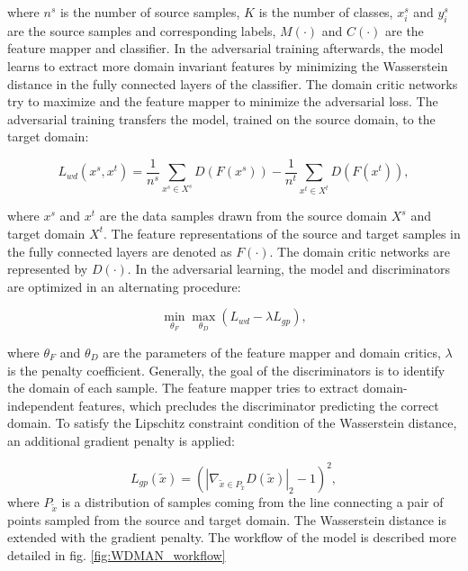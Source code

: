 where $n^{s}$ is the number of source samples, $K$ is the number of classes, $x_{i}^{s}$ and $y_{i}^{s}$ are the source samples and corresponding labels, $M(\cdot)$ and $C(\cdot)$ are the feature mapper and classifier. In the adversarial training afterwards, the model learns to extract more domain invariant features by minimizing the Wasserstein distance in the fully connected layers of the classifier. The domain critic networks try to maximize and the feature mapper to minimize the adversarial loss. The adversarial training transfers the model, trained on the source domain, to the target domain:
 
\begin{equation}
     L_{wd}(x^{s}, x^{t}) = \frac{1}{n^{s}} \sum_{x^{s} \in X^{s}} D(F(x^{s})) - \frac{1}{n^{t}} \sum_{x^{t} \in X^{t}} D(F(x^{t})),
\end{equation}

where $x^{s}$ and $x^{t}$ are the data samples drawn from the source domain $X^{s}$ and target domain $X^{t}$. The feature representations of the source and target samples in the fully connected layers are denoted as $F(\cdot)$. The domain critic networks are represented by $D(\cdot)$. In the adversarial learning, the model and discriminators are optimized in an alternating procedure:

\begin{equation}
    \min_{\theta_{F}} \max_{\theta_{D}} (L_{wd} - \lambda L_{gp}), 
\end{equation}

where $\theta_{F}$ and $\theta_{D}$ are the parameters of the feature mapper and domain critics, $\lambda$ is the penalty coefficient. Generally, the goal of the discriminators is to identify the domain of each sample. The feature mapper tries to extract domain-independent features, which precludes the discriminator predicting the correct domain. To satisfy the Lipschitz constraint condition of the Wasserstein distance, an additional gradient penalty is applied: 

\begin{equation}
     L_{gp}(\tilde{x}) = (|\nabla_{\tilde{x} \in P_{\tilde{x}}} D(\tilde{x})|_{2}-1)^{2}, 
\end{equation}
where $P_{\tilde{x}}$ is a distribution of samples coming from the line connecting a pair of points sampled from the source and target domain. The Wasserstein distance is extended with the gradient penalty. The workflow of the model is described more detailed in fig. \ref{fig:WDMAN_workflow}
 

